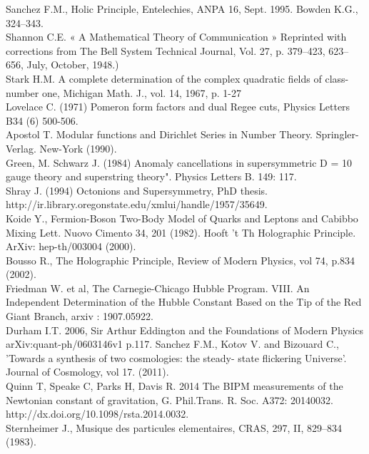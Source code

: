 \documentclass[a4paper,9pt]{article}
\begin{document}
\begin{thebibliography}{99}
  Sanchez F.M., Holic Principle, Entelechies, ANPA 16, Sept. 1995. Bowden K.G., 324--343.\\
 Shannon C.E. « A Mathematical Theory of Communication » Reprinted with corrections from The Bell System Technical Journal, Vol. 27, p. 379–423, 623–656, July, October, 1948.)\\
 Stark H.M. A complete determination of the complex quadratic fields of class-number one, Michigan Math. J., vol. 14,‎ 1967, p. 1-27  \\
 Lovelace C. (1971) Pomeron form factors and dual Regee cuts, Physics Letters B34 (6) 500-506.\\
 Apostol T. Modular functions and Dirichlet Series in Number Theory. Springler-Verlag. New-York (1990).\\
 Green, M. Schwarz J. (1984)  Anomaly cancellations in supersymmetric D = 10 gauge theory and superstring theory". Physics Letters B. 149: 117.\\
 Shray J. (1994) Octonions and Supersymmetry, PhD thesis.  http://ir.library.oregonstate.edu/xmlui/handle/1957/35649. \\
 Koide Y., Fermion-Boson Two-Body Model of Quarks and Leptons and Cabibbo Mixing  Lett. Nuovo Cimento 34, 201 (1982). 
 Hooft 't Th Holographic Principle. ArXiv: hep-th/003004 (2000). \\
 Bousso R., The Holographic Principle, Review of Modern Physics, vol 74, p.834 (2002).\\
 Friedman W. et al, The Carnegie-Chicago Hubble Program. VIII. An Independent Determination of the Hubble Constant Based on the Tip of the Red Giant Branch, arxiv : 1907.05922.\\ 
 Durham I.T. 2006, Sir Arthur Eddington and the Foundations of Modern Physics arXiv:quant-ph/0603146v1  p.117.
 Sanchez F.M., Kotov V. and Bizouard C., 'Towards a synthesis of two cosmologies: the steady- state flickering Universe'. Journal of Cosmology, vol 17. (2011).\\
 Quinn T, Speake C, Parks H, Davis R. 2014 The BIPM measurements of the Newtonian constant of gravitation, G. Phil.Trans. R. Soc. A372: 20140032. http://dx.doi.org/10.1098/rsta.2014.0032. \\
 Sternheimer J., Musique des particules elementaires, CRAS, 297, II, 829--834 (1983).\\

\end{thebibliography}
\end{document}
